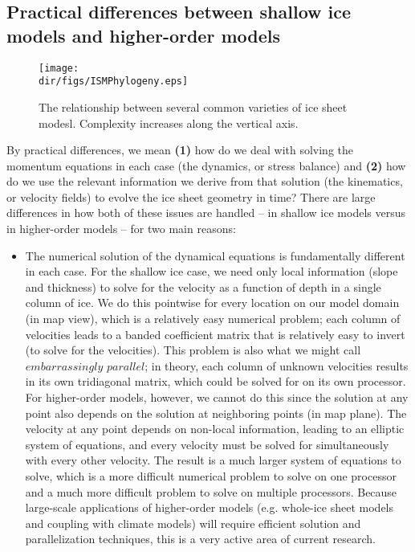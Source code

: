 \subsection{Practical differences between shallow ice models and higher-order models}

\begin{figure}
  \begin{center}
    \texttt{[image: \\dir/figs/ISMPhylogeny.eps]}
   \end{center}
  \caption{The relationship between several common varieties of ice sheet modesl. Complexity increases along the vertical axis.}
   \label{fig:phylogeny}
\end{figure} 

By practical differences, we mean \textbf{(1)} how do we deal with solving the momentum equations in each case (the dynamics, or stress balance) and \textbf{(2)} how do we use the relevant information we derive from that solution (the kinematics, or velocity fields) to evolve the ice sheet geometry in time? There are large differences in how both of these issues are handled -- in shallow ice models versus in higher-order models -- for two main reasons:

\begin{itemize}
\item  The numerical solution of the dynamical equations is fundamentally different in each case. For the shallow ice case, we need only local information (slope and thickness) to solve for the velocity as a function of depth in a single column of ice. We do this pointwise for every location on our model domain (in map view), which is a relatively easy numerical problem; each column of velocities leads to a banded coefficient matrix that is relatively easy to invert (to solve for the velocities). This problem is also what we might call $embarrassingly$ $parallel$; in theory, each column of unknown velocities results in its own tridiagonal matrix, which could be solved for on its own processor. For higher-order models, however, we cannot do this since the solution at any point also depends on the solution at neighboring points (in map plane). The velocity at any point depends on non-local information, leading to an elliptic system of equations, and every velocity must be solved for simultaneously with every other velocity. The result is a much larger system of equations to solve, which is a more difficult numerical problem to solve on one processor and a much more difficult problem to solve on multiple processors. Because large-scale applications of higher-order models (e.g. whole-ice sheet models and coupling with climate models) will require efficient solution and parallelization techniques, this is a very active area of current research.  
\end{itemize}

